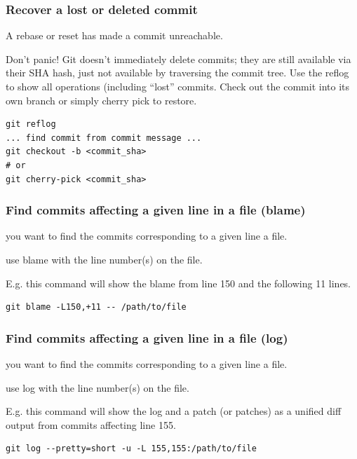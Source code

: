 \documentclass{git_course}
\begin{document}
\begin{frame}[fragile]
    \frametitle{Recover a lost or deleted commit}
     A rebase or reset has made a commit unreachable.

     Don't panic! Git doesn't immediately delete commits;
    they are still available via their SHA hash, just not available by
    traversing the commit tree.  Use the reflog to show all operations
    (including ``lost'' commits.  Check out the commit into its own branch
    or simply cherry pick to restore.
\begin{lstlisting}
git reflog
... find commit from commit message ...
git checkout -b <commit_sha>
# or
git cherry-pick <commit_sha>
\end{lstlisting}

\end{frame}

\begin{frame}[fragile]
    \frametitle{Find commits affecting a given line in a file (blame)}

     you want to find the commits corresponding to a given
    line a file.

     use blame with the line number(s) on the file.

E.g. this command will show the blame from line 150 and the following 11 lines.
\begin{lstlisting}
git blame -L150,+11 -- /path/to/file
\end{lstlisting}

\end{frame}

\begin{frame}[fragile]
    \frametitle{Find commits affecting a given line in a file (log)}

     you want to find the commits corresponding to a given
    line a file.

     use log with the line number(s) on the file.

    E.g. this command will show the log and a patch (or patches) as a unified diff
    output from commits affecting line 155.
\begin{lstlisting}
git log --pretty=short -u -L 155,155:/path/to/file
\end{lstlisting}

\end{frame}
\end{document}
